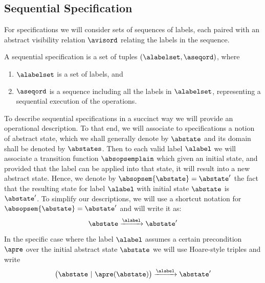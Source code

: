 \subsection{Sequential Specification}
\label{subsec:sequential specification}

For specifications we will consider sets of sequences of labels, each
paired with an abstract visibility relation $\avisord$ relating the
labels in the sequence.


\begin{definition}
  \label{definition:sequential specification} A sequential
  specification is a set of tuples $(\alabelset, \aseqord)$, where
  \begin{enumerate}
  \item $\alabelset$ is a set of labels, and
  \item $\aseqord$ is a sequence including all the labels in $\alabelset$,
    representing a sequential execution of the operations.
  \end{enumerate}
\end{definition}

To describe sequential specifications in a succinct way we will
provide an operational description.
To that end, we will associate to specifications a notion of abstract
state, which we shall generally denote by $\abstate$ and its domain
shall be denoted by $\abstates$.
Then to each valid label $\alabel$ we will associate a transition
function $\absopsemplain$ which given an initial state, and provided
that the label can be applied into that state, it will result into a
new abstract state.
Hence, we denote by $\absopsem{\abstate} = \abstate'$ the fact that
the resulting state for label $\alabel$ with initial state $\abstate$
is $\abstate'$.
%
To simplify our descriptions, we will use a shortcut notation for
$\absopsem{\abstate} = \abstate'$ and will write it as:
\[ \abstate \xrightarrow{\alabel}  \abstate' \]

In the specific case where the label $\alabel$ assumes a certain
precondition $\apre$ over the initial abstract state $\abstate$ we
will use Hoare-style triples and write
\[ \big(\abstate\ |\ \apre(\abstate)\big) \xrightarrow{\alabel}  \abstate' \]

